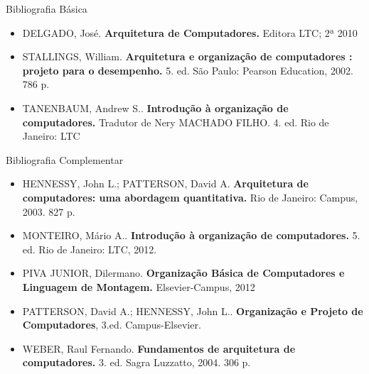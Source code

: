 \documentclass[aspectratio=169,
				xcolor=table]{beamer}
\begin{document}
	\begin{frame}{Bibliografia Básica}
		\begin{itemize}
			\item DELGADO, José. \textbf{Arquitetura de Computadores.} Editora LTC; 2ª 2010
			\vspace{1em}
			\item STALLINGS, William. \textbf{Arquitetura e organização de computadores : projeto para o desempenho.} 5. ed. São Paulo: Pearson  Education, 2002. 786 p.
			\vspace{1em}
			\item TANENBAUM, Andrew S.. \textbf{Introdução à organização de computadores.} Tradutor de Nery MACHADO FILHO. 4. ed.  Rio de Janeiro: LTC

		\end{itemize}
	\end{frame}
	
	\begin{frame}[allowframebreaks]{Bibliografia Complementar}
		\begin{itemize}
			\item HENNESSY, John L.; PATTERSON, David A. \textbf{Arquitetura de computadores: uma abordagem quantitativa.} Rio de  Janeiro: Campus, 2003. 827 p.
			\vspace{1em}
			\item MONTEIRO, Mário A.. \textbf{Introdução à organização de computadores.} 5. ed. Rio de Janeiro: LTC, 2012.
			\vspace{1em}
			\item PIVA JUNIOR, Dilermano. \textbf{Organização Básica de Computadores e Linguagem de Montagem.} Elsevier-Campus, 2012
			\framebreak
			\item PATTERSON, David A.; HENNESSY, John L.. \textbf{Organização e Projeto de Computadores}, 3.ed.  Campus-Elsevier.
			\vspace{1em}
			\item WEBER, Raul Fernando. \textbf{Fundamentos de arquitetura de computadores.} 3. ed. Sagra Luzzatto, 2004. 306 p.

		\end{itemize}
	\end{frame}
	
	\begin{frame}{}
		
	\end{frame}
\end{document}
